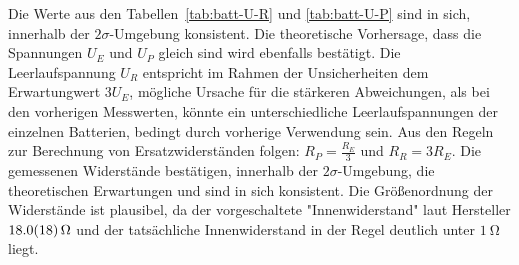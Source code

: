 Die Werte aus den Tabellen~\ref{tab:batt-U-R} und \ref{tab:batt-U-P} sind in sich, innerhalb der  $2\sigma$-Umgebung konsistent. 
Die theoretische Vorhersage, dass die Spannungen $U_E$ und $U_P$ gleich sind wird ebenfalls bestätigt. Die Leerlaufspannung $U_R$ entspricht im Rahmen der Unsicherheiten dem Erwartungwert $3U_E$, mögliche Ursache für die stärkeren Abweichungen, als bei den vorherigen Messwerten, könnte ein unterschiedliche Leerlaufspannungen der einzelnen Batterien, bedingt durch vorherige Verwendung sein. Aus den Regeln zur Berechnung von Ersatzwiderständen folgen: $R_P=\frac{R_E}{3}$ und $R_R=3R_E$.
Die gemessenen Widerstände bestätigen, innerhalb der $2\sigma$-Umgebung, die theoretischen Erwartungen und sind in sich konsistent. Die Größenordnung der Widerstände ist plausibel, da der vorgeschaltete "Innenwiderstand" laut Hersteller $\SI{18.0+-1.8}{\ohm}$ und der tatsächliche Innenwiderstand in der Regel  deutlich unter $\SI{1}{\ohm}$ liegt. %



